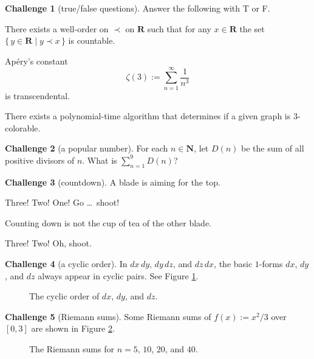 \documentclass[11pt]{amsart}
\theoremstyle{definition}
\newtheorem{challenge}{Challenge}
\newcommand{\N}{\mathbf{N}}
\newcommand{\R}{\mathbf{R}}
\begin{document}
\begin{challenge}[true/false questions]
Answer the following with T or F.

\begin{tfprob}
There exists a well-order on $\prec$ on $\R$ such that for any $x \in \R$
the set $\{\,y \in \R \mid y \prec x\,\}$ is countable.
\end{tfprob}

\begin{tfprob}
Ap\'ery's constant
\[ \zeta(3) := \sum_{n=1}^\infty \frac{1}{n^3} \]
is transcendental.
\end{tfprob}

\begin{tfprob}
There exists a polynomial-time algorithm that determines if a given
graph is $3$-colorable.
\end{tfprob}
\end{challenge}


\begin{challenge}[a popular number]
For each $n \in \N$, let $D(n)$ be the sum of all positive divisors of $n$.
What is $\sum_{n=1}^9 D(n)$?

\end{challenge}



\begin{challenge}[countdown]


A blade is aiming for the top.
\begin{renumerate}{3}
\ritem
Three!
\ritem
Two!
\ritem
One!
\ritem
Go \ldots\ shoot!
\end{renumerate}
Counting down is not the cup of tea of the other blade.
\begin{renumerate}{2}
\ritem
Three!
\ritem
Two!
\ritem
Oh, shoot.
\end{renumerate}
\end{challenge}

\begin{challenge}[a cyclic order]
In $dx\,dy$, $dy\,dz$, and $dz\,dx$, the basic $1$-forms $dx$, $dy$, and $dz$
always appear in cyclic pairs. See Figure \ref{fig:cycle}.

\begin{figure}[h]

\caption{The cyclic order of $dx$, $dy$, and $dz$.}
\label{fig:cycle}
\end{figure}
\end{challenge}

\begin{challenge}[Riemann sums]
Some Riemann sums of $f(x):=x^2/3$ over $[0,3]$ are shown in Figure
\ref{fig:riemann}.

\begin{figure}[h]

\caption{The Riemann sums for $n=5$, $10$, $20$, and $40$.}
\label{fig:riemann}
\end{figure}
\end{challenge}

\end{document}
